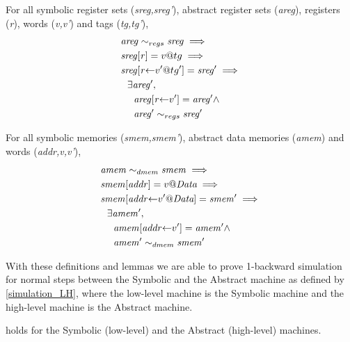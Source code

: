 \begin{lemma}
\label{refine_registers_upd}
For all symbolic register sets (\textit{sreg,sreg'}),
abstract register sets (\textit{areg}), registers (\textit{r}),
words (\textit{v,v'}) and tags (\textit{tg,tg'}),
\begin{align*}
  & \mathit{areg} \sim_{regs} \mathit{sreg} \implies \\
  & \mathit{sreg}[\mathit{r}] = v@tg \implies \\
  & \mathit{sreg}[\mathit{r}{\leftarrow}v'@tg'] = \mathit{sreg'} \implies \\
  & ~~ \exists \mathit{areg'}, \\
  & ~~~~ \mathit{areg}[\mathit{r}{\leftarrow}v'] = \mathit{areg'} \land \\
  & ~~~~  \mathit{areg'} \sim_{regs} \mathit{sreg'}
\end{align*}
\end{lemma}

\begin{lemma}
\label{refine_memory_upd}
For all symbolic memories (\textit{smem,smem'}),
abstract data memories (\textit{amem}) and
words (\textit{addr,v,v'}),
\begin{align*}
  & \mathit{amem} \sim_{dmem} \mathit{smem} \implies \\
  & \mathit{smem}[\mathit{addr}] = v@\textit{Data} \implies \\
  & \mathit{smem}[\mathit{addr}{\leftarrow}v'@\textit{Data}] = \mathit{smem'} \implies \\
  & ~~ \exists \mathit{amem'}, \\
  & ~~~~ \mathit{amem}[\mathit{addr}{\leftarrow}v'] = \mathit{amem'} \land \\
  & ~~~~  \mathit{amem'} \sim_{dmem} \mathit{smem'}
\end{align*}
\end{lemma}

With these definitions and lemmas we are able to prove 1-backward simulation
for normal steps between the Symbolic and the Abstract machine as defined
by \cref{simulation_LH}, where the low-level machine is the Symbolic machine and
the high-level machine is the Abstract machine.

\begin{theorem}
\label{simulation_SA}
 holds for the Symbolic (low-level) and
the Abstract (high-level) machines.
\end{theorem}

